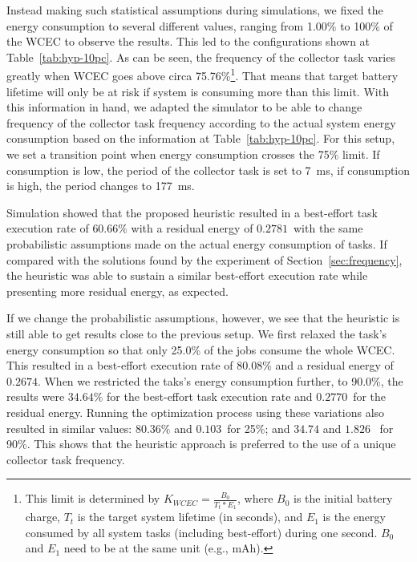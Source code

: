 Instead making such statistical assumptions during simulations, we fixed the
energy consumption to several different values, ranging from 1.00\% to 100\% of
the WCEC to observe the results. This led to the configurations shown at
Table~\ref{tab:hyp-10pc}. As can be seen, the frequency of the collector task
varies greatly when WCEC goes above circa 75.76\%\footnote{This limit is
determined by $K_{WCEC} = \frac{B_0}{T_t * E_1}$, where $B_0$ is the initial
battery charge, $T_t$ is the target system lifetime (in seconds), and $E_1$ is
the energy consumed by all system tasks (including best-effort) during one
second. $B_0$ and $E_1$ need to be at the same unit (e.g., mAh).}. That means
that target battery lifetime will only be at risk if system is consuming more
than this limit. With this information in hand, we adapted the simulator to be
able to change frequency of the collector task frequency according to the actual
system energy consumption based on the information at Table~\ref{tab:hyp-10pc}.
For this setup, we set a transition point when energy consumption crosses the
75\% limit. If consumption is low, the period of the collector task is set to
7~ms, if consumption is high, the period changes to 177~ms.

Simulation showed that the proposed heuristic resulted in a best-effort task
execution rate of $60.66\%$ with a residual energy of $0.2781$\promille~with the
same probabilistic assumptions made on the actual energy consumption of tasks.
If compared with the solutions found by the experiment of
Section~\ref{sec:frequency}, the heuristic was able to sustain a similar
best-effort execution rate while presenting more residual energy, as expected.

If we change the probabilistic assumptions, however, we see that the heuristic
is still able to get results close to the previous setup. We first relaxed the
task's energy consumption so that only 25.0\% of the jobs consume the whole
WCEC. This resulted in a best-effort execution rate of $80.08\%$ and a residual
energy of $0.2674$\promille. When we restricted the taks's energy consumption
further, to 90.0\%, the results were $34.64\%$ for the best-effort task
execution rate and $0.2770$\promille~for the residual energy. Running the
optimization process using these variations also resulted in similar values:
$80.36\%$ and $0.103$\promille~for 25\%; and $34.74$ and $1.826$\promille~ for
90\%. This shows that the heuristic approach is preferred to the use of a unique
collector task frequency.
